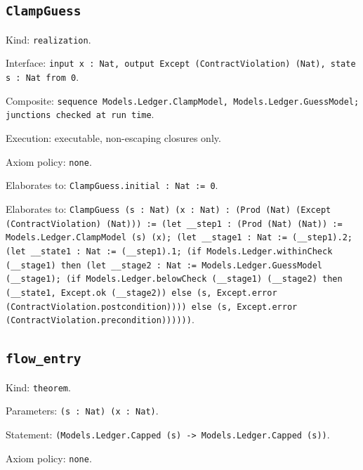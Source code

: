 \documentclass[11pt]{article}
\begin{document}
\subsection*{\texttt{ClampGuess}}
\noindent Kind: \texttt{realization}.\par
\noindent Interface: \texttt{input x : Nat, output Except (ContractViolation) (Nat), state s : Nat from 0}.\par
\noindent Composite: \texttt{sequence Models.Ledger.ClampModel, Models.Ledger.GuessModel; junctions checked at run time}.\par
\noindent Execution: executable, non-escaping closures only.\par
\noindent Axiom policy: \texttt{none}.\par
\noindent Elaborates to: \texttt{ClampGuess.initial : Nat := 0}.\par
\noindent Elaborates to: \texttt{ClampGuess (s : Nat) (x : Nat) : (Prod (Nat) (Except (ContractViolation) (Nat))) := (let \_\_step1 : (Prod (Nat) (Nat)) := Models.Ledger.ClampModel (s) (x); (let \_\_stage1 : Nat := (\_\_step1).2; (let \_\_state1 : Nat := (\_\_step1).1; (if Models.Ledger.withinCheck (\_\_stage1) then (let \_\_stage2 : Nat := Models.Ledger.GuessModel (\_\_stage1); (if Models.Ledger.belowCheck (\_\_stage1) (\_\_stage2) then (\_\_state1, Except.ok (\_\_stage2)) else (s, Except.error (ContractViolation.postcondition)))) else (s, Except.error (ContractViolation.precondition))))))}.\par
\subsection*{\texttt{flow\_entry}}
\noindent Kind: \texttt{theorem}.\par
\noindent Parameters: \texttt{(s : Nat) (x : Nat)}.\par
\noindent Statement: \texttt{(Models.Ledger.Capped (s) -> Models.Ledger.Capped (s))}.\par
\noindent Axiom policy: \texttt{none}.\par
\end{document}
